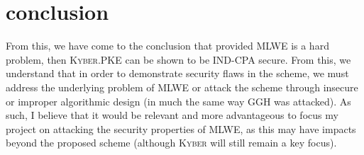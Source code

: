 \documentclass[a4paper, 10pt]{article}
\theoremstyle{definition}
\begin{document}
\section{conclusion}

From this, we have come to the conclusion that provided MLWE is a hard problem, then \textsc{Kyber}.PKE can be shown to be IND-CPA secure. From this, we understand that in order to demonstrate security flaws in the scheme, we must address the underlying problem of MLWE or attack the scheme through insecure or improper algorithmic design (in much the same way GGH\cite{GGH} was attacked). As such, I believe that it would be relevant and more advantageous to focus my project on attacking the security properties of MLWE, as this may have impacts beyond the proposed scheme (although \textsc{Kyber} will still remain a key focus).


\newpage
    
\nocite{*}
\printbibliography
\end{document}
